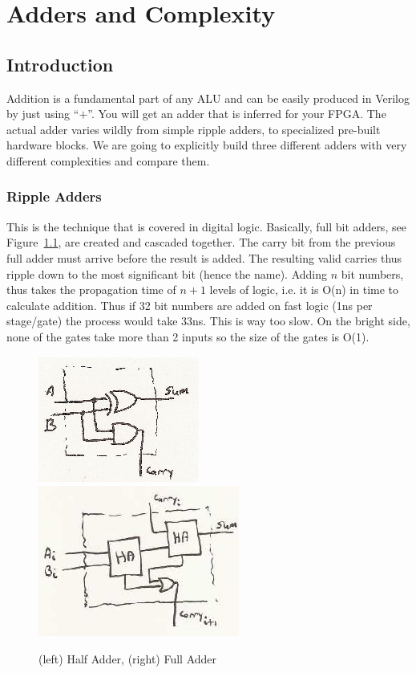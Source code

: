 \chapter{Adders and Complexity}

\section{Introduction}

Addition is a fundamental part of any ALU and can be easily produced in Verilog by just using ``$+$''.  You will get an adder that is inferred for your FPGA.  The actual adder varies wildly from simple ripple adders, to specialized pre-built hardware blocks.  We are going to explicitly build three different adders with very different complexities and compare them.

\subsection{Ripple Adders}

This is the technique that is covered in digital logic.  Basically, full bit adders, see Figure~\ref{f-half_full_add}, are created and cascaded together.  The carry bit from the previous full adder must arrive before the result is added.  The resulting valid carries thus ripple down to the most significant bit (hence the name).  Adding $n$ bit numbers, thus takes the propagation time of $n+1$ levels of logic, i.e. it is O(n) in time to calculate addition.  Thus if 32 bit numbers are added on fast logic (1ns per stage/gate) the process would take 33ns.  This is way too slow.  On the bright side, none of the gates take more than 2 inputs so the size of the gates is O(1).

\begin{figure}
\caption{(left) Half Adder, (right) Full Adder}\label{f-half_full_add}
\begin{center}
\includegraphics{ha.png} \hspace{.2in} \includegraphics{fa.png}
\end{center}
\end{figure}

